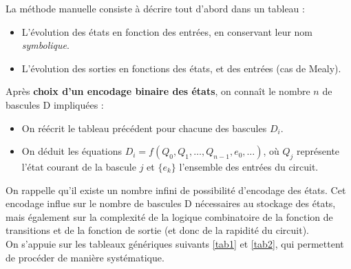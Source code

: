 \documentclass[a4paper,11pt]{article}
\begin{document}
\begin{notebox}
  La méthode manuelle consiste à décrire tout d'abord dans un tableau :

  \begin{itemize}
    \item L'évolution des états en fonction des entrées, en conservant leur nom \textit{symbolique}.
    \item L'évolution des sorties en fonctions des états, et des entrées (cas de Mealy).
  \end{itemize}

  Après \textbf{choix d'un encodage binaire des états}, on connaît le nombre $n$ de bascules D impliquées :
\begin{itemize}
  \item On réécrit le tableau précédent pour chacune des bascules $D_i$.
  \item On déduit les équations $D_i=f(Q_0,Q_1,\dots,Q_{n-1},e_0,\dots)$, où $Q_j$ représente l'état courant de la bascule $j$ et $\{e_k\} $ l'ensemble des entrées du circuit.
\end{itemize}

\end{notebox}

 On rappelle qu'il existe un nombre infini de possibilité d'encodage des états. Cet encodage influe sur le nombre de bascules D nécessaires au stockage des états, mais également sur la complexité de la logique combinatoire de la fonction de transitions et de la fonction de sortie (et donc de la rapidité du circuit).\\

 On s'appuie sur les tableaux génériques suivants \ref{tab1} et \ref{tab2}, qui permettent de procéder de manière systématique.
\end{document}
